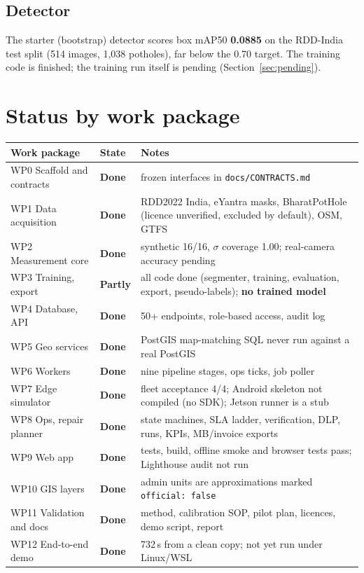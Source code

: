 \documentclass[11pt,a4paper]{article}
\newcommand{\done}{\textcolor{gmok}{\textbf{Done}}}
\newcommand{\partly}{\textcolor{gmwarn}{\textbf{Partly}}}
\newcommand{\code}[1]{\texttt{\small #1}}
\begin{document}
\subsection{Detector}
The starter (bootstrap) detector scores box mAP50 \textbf{0.0885} on the RDD-India test split (514 images, 1,038
potholes), far below the 0.70 target. The training code is finished; the training run itself is pending
(Section~\ref{sec:pending}).

\section{Status by work package}\label{sec:status}

\begin{longtable}{@{}p{} p{} p{}@{}}
\toprule
\textbf{Work package} & \textbf{State} & \textbf{Notes}\\
\midrule
\endhead
WP0 Scaffold and contracts & \done & frozen interfaces in \code{docs/CONTRACTS.md}\\
WP1 Data acquisition & \done & RDD2022 India, eYantra masks, BharatPotHole (licence unverified, excluded by default), OSM, GTFS\\
WP2 Measurement core & \done & synthetic 16/16, $\sigma$ coverage 1.00; real-camera accuracy pending\\
WP3 Training, export & \partly & all code done (segmenter, training, evaluation, export, pseudo-labels); \textbf{no trained model}\\
WP4 Database, API & \done & 50+ endpoints, role-based access, audit log\\
WP5 Geo services & \done & PostGIS map-matching SQL never run against a real PostGIS\\
WP6 Workers & \done & nine pipeline stages, ops ticks, job poller\\
WP7 Edge simulator & \done & fleet acceptance 4/4; Android skeleton not compiled (no SDK); Jetson runner is a stub\\
WP8 Ops, repair planner & \done & state machines, SLA ladder, verification, DLP, runs, KPIs, MB/invoice exports\\
WP9 Web app & \done & tests, build, offline smoke and browser tests pass; Lighthouse audit not run\\
WP10 GIS layers & \done & admin units are approximations marked \code{official: false}\\
WP11 Validation and docs & \done & method, calibration SOP, pilot plan, licences, demo script, report\\
WP12 End-to-end demo & \done & 732\,s from a clean copy; not yet run under Linux/WSL\\
\bottomrule
\end{longtable}
\end{document}
